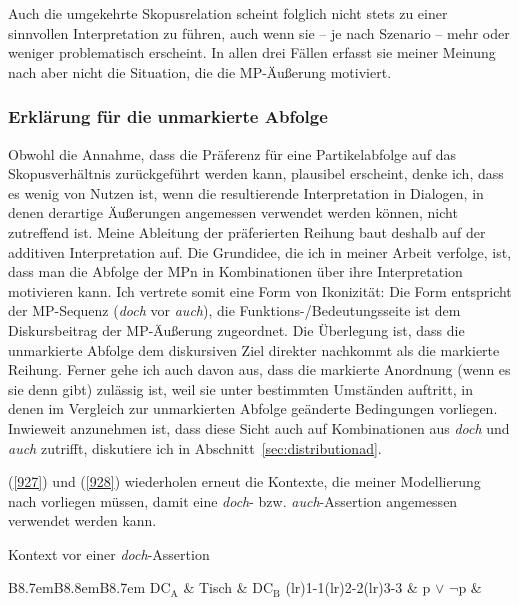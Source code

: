 {Auch die umgekehrte Skopusrelation scheint folglich nicht stets zu einer sinn\-vollen Interpretation zu führen, auch wenn sie – je nach Szenario – mehr oder weniger problematisch erscheint. In allen drei Fällen erfasst sie meiner Meinung nach aber nicht die Situation, die die MP-Äußerung motiviert.

\subsubsection{Erklärung für die unmarkierte Abfolge}
Obwohl die Annahme, dass die Präferenz für eine Partikelabfolge auf das Skopusverhältnis zurückgeführt werden kann, plausibel erscheint, denke ich, dass es wenig von Nutzen ist, wenn die resultierende Interpretation in Dialogen, in denen derartige Äußerungen angemessen verwendet werden können, nicht zu\-treffend ist. Meine Ableitung der präferierten Reihung baut deshalb auf der additiven Interpretation auf. Die Grundidee, die ich in meiner Arbeit verfolge, ist, dass man die Abfolge der MPn in Kombinationen über ihre Interpretation motivieren kann. Ich vertrete somit eine Form von Ikonizität: Die Form entspricht der MP-Sequenz (\textit{doch} vor \textit{auch}), die Funktions-/Bedeutungsseite ist dem Diskursbeitrag der MP-Äußerung zugeordnet. Die Überlegung ist, dass die unmarkierte Abfolge dem diskursiven Ziel direkter nachkommt als die markierte Reihung. Ferner gehe ich auch davon aus, dass die markierte Anordnung (wenn es sie denn gibt) zulässig ist, weil sie unter bestimmten Umständen auftritt, in denen im Vergleich zur unmarkierten Abfolge geänderte Bedingungen vorliegen. Inwieweit anzunehmen ist, dass diese Sicht auch auf Kombinationen aus \textit{doch} und \textit{auch} zutrifft, diskutiere ich in Abschnitt~\ref{sec:distributionad}.

(\ref{927}) und (\ref{928}) wiederholen erneut die Kontexte, die meiner Modellierung nach vorliegen müssen, damit eine \textit{doch}- bzw. \textit{auch}-Assertion angemessen verwendet werden kann.

\begin{exe}
	\ex\label{927} Kontext vor einer \textit{doch}-Assertion\\[-.5em]
 	\begin{tabular}[t]{B{8.7em}B{8.8em}B{8.7em}}
\lsptoprule 	
 	$\textrm{DC}_{\textrm{A}}$ & {Tisch} & $\textrm{DC}_{\textrm{B}}$ \tabularnewline\cmidrule(lr){1-1}\cmidrule(lr){2-2}\cmidrule(lr){3-3}
    & p $\vee$ $\neg$p & \tabularnewline\midrule      
   	 \tabularnewline   
   	\lspbottomrule
\end{tabular}
\end{exe}

}
